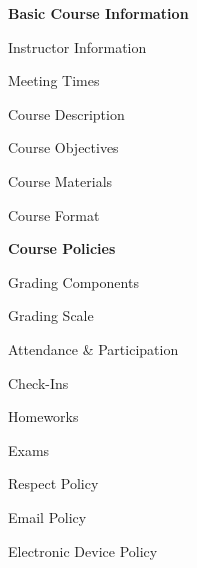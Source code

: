 \documentclass[11pt,letterpaper]{article}
\begin{document}
\mytitle


\begin{minipage}[t]{0.45\textwidth} %
{\bfseries\color{scred} Basic Course Information} \dotfill \pageref{course_info} \par
\hspace{0.3cm} Instructor Information \dotfill \pageref{instr_info} \par
\hspace{0.3cm} Meeting Times \dotfill \pageref{meetings} \par
\hspace{0.3cm} Course Description \dotfill \pageref{course_desc} \par
\hspace{0.3cm} Course Objectives \dotfill \pageref{course_obj} \par
\hspace{0.3cm} Course Materials \dotfill \pageref{course_mat} \par
\hspace{0.3cm} Course Format \dotfill \pageref{course_format} \par
{\bfseries\color{scred} Course Policies} \dotfill \pageref{course_policies} \par
\hspace{0.3cm} Grading Components \dotfill \pageref{grade_comp} \par
\hspace{0.3cm} Grading Scale \dotfill \pageref{grade_scale} \par
\hspace{0.3cm} Attendance \& Participation \dotfill \pageref{attend} \par
\hspace{0.3cm} Check-Ins \dotfill \pageref{check} \par
\hspace{0.3cm} Homeworks \dotfill \pageref{hw} \par
\hspace{0.3cm} Exams \dotfill \pageref{exams} \par
\hspace{0.3cm} Respect Policy \dotfill \pageref{respect} \par
\hspace{0.3cm} Email Policy \dotfill \pageref{email_policy} \par 
\hspace{0.3cm} Electronic Device Policy \dotfill \pageref{electronic} \par

\end{minipage}
\end{document}
